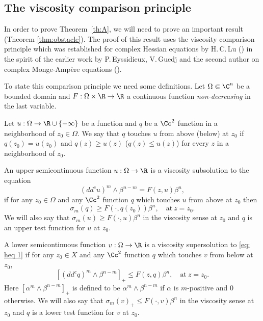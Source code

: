 \subsection{The viscosity comparison principle}

In order to prove Theorem~\ref{th:A}, we will need to prove an important result (Theorem \ref{thm:obstacle}). The proof of this result uses the viscosity comparison principle which was established for complex Hessian equations by H.\,C.\,Lu (\cite{Lu13}) in the spirit of the earlier work by P.\,Eyssidieux, V.\,Guedj and the second author on complex Monge-Ampère equations (\cite{EGZ11}).

To state this comparison principle we need some definitions. Let $\Omega \Subset \C^n$ be a bounded domain and $F: \Omega \times \R \to \R$ a continuous function \emph{non-decreasing} in the last variable.
\begin{definition}
Let $u: \Omega\to \R\cup\{-\infty\}$ be a function and $q$ be a $\Cc^2$ function in a neighborhood of $z_0\in \Omega$. We say that $q$ touches $u$ from above (\resp below) at $z_0$ if $q(z_0)=u(z_0)$ and $q(z)\geq u(z)$ (\resp $q(z)\leq u(z)$) for every $z$ in a neighborhood of $z_0$.
\end{definition}

\begin{definition}\label{def: viscosity subsolution}
An upper semicontinuous function $u: \Omega\to \R$ is a viscosity subsolution to the equation
\begin{equation}\label{eq: heq 1}
(dd^c u)^m\wedge \beta^{n-m} = F(z,u)\beta^n,
\end{equation}
if for any $z_0\in \Omega$ and any $\Cc^2$ function $q$ which touches $u$ from above at $z_0$ then
\[
\sigma_m(q) \geq F(\cdot,q (z_0))\beta^n, \quad \text{at} \ z = z_0.
\]
We will also say that $\sigma_m(u)\geq F(\cdot,u)\beta^n$ in the viscosity sense at $z_0$ and $q$ is an upper test function for $u$ at $z_0$.
\end{definition}
\begin{definition}\label{def: viscosity supersolution}
A lower semicontinuous function $v: \Omega \to \R$ is a viscosity supersolution to \eqref{eq: heq 1} if for any $z_0\in X$ and any $\Cc^2$ function $q$ which touches $v$ from below at $z_0$,
\[
[(dd^c q)^m\wedge \beta^{n-m}]_+\leq F(z,q)\beta^n, \quad \text{at} \ z = z_0.
\]
Here $[\alpha^m\wedge\beta^{n-m}]_+$ is defined to be $\alpha^m\wedge\beta^{n-m} $ if $\alpha$ is $m$-positive and $0$ otherwise. We will also say that $\sigma_m(v)_+ \leq F(\cdot,v)\beta^n$ in the viscosity sense at $z_0$ and $q$ is a lower test function for $v$ at $z_0$.
\end{definition}

